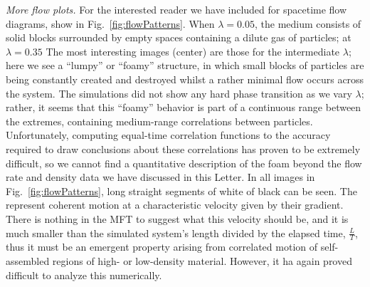 \documentclass[
reprint,
 amsmath,amssymb,
 aps,
 prl,
]{revtex4-1}
\begin{document}
\textit{More flow plots.} For the interested reader we have included for spacetime flow diagrams, show in Fig.~\ref{fig:flowPatterns}. When $\lambda=0.05$, the medium consists of solid blocks surrounded by empty spaces containing a dilute
gas of particles; at $\lambda=0.35$
The most interesting images (center) are those for the intermediate $\lambda$; here we see a ``lumpy'' or ``foamy'' structure, in which small blocks
of particles are being constantly created and destroyed whilst a rather minimal flow occurs across the system.
The simulations did not show any hard phase transition as we vary $\lambda$; rather, it seems that this ``foamy''
behavior is part of a continuous range between the extremes, containing medium-range correlations between particles.
Unfortunately, computing equal-time correlation functions to the accuracy required
to draw conclusions about these correlations has proven to be extremely difficult, so we cannot find a quantitative description of the foam beyond the flow rate and density data we have discussed in this Letter.
In all images in Fig.~\ref{fig:flowPatterns}, long straight segments of white of black can be seen.  The represent coherent motion at a characteristic velocity given by their gradient. There is nothing in the MFT to suggest what this velocity
should be, and it is much smaller than the simulated system's length divided by the elapsed time,  $\frac{L}{T}$, thus it must be an emergent property arising from correlated motion of self-assembled regions of  high- or low-density material.
However, it ha again proved difficult to analyze this numerically.
\end{document}
